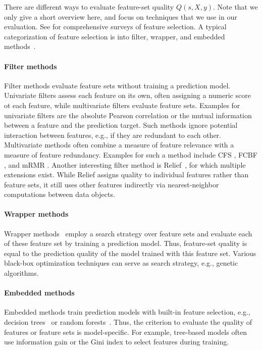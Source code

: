 \documentclass{article}
\theoremstyle{definition}
\begin{document}
There are different ways to evaluate feature-set quality $Q(s,X,y)$.
Note that we only give a short overview here, and focus on techniques that we use in our evaluation.
See \cite{chandrashekar2014survey,li2017feature} for comprehensive surveys of feature selection.
A typical categorization of feature selection is into filter, wrapper, and embedded methods~\cite{guyon2003introduction}.

\paragraph{Filter methods}

Filter methods evaluate feature sets without training a prediction model.
Univariate filters assess each feature on its own, often assigning a numeric score ot each feature, while multivariate filters evaluate feature sets.
Examples for univariate filters are the absolute Pearson correlation or the mutual information between a feature and the prediction target.
Such methods ignore potential interaction between features, e.g., if they are redundant to each other.
Multivariate methods often combine a measure of feature relevance with a measure of feature redundancy.
Examples for such a method include CFS \cite{hall1999correlation}, FCBF \cite{yu2003feature}, and mRMR \cite{peng2005feature}.
Another interesting filter method is Relief~\cite{kira1992feature}, for which multiple extensions exist.
While Relief assigns quality to individual features rather than feature sets, it still uses other features indirectly via nearest-neighbor computations between data objects.

\paragraph{Wrapper methods}

Wrapper methods~\cite{kohavi1997wrappers} employ a search strategy over feature sets and evaluate each of these feature set by training a prediction model.
Thus, feature-set quality is equal to the prediction quality of the model trained with this feature set.
Various black-box optimization techniques can serve as search strategy, e.g., genetic algorithms.

\paragraph{Embedded methods}

Embedded methods train prediction models with built-in feature selection, e.g., decision trees~\cite{breiman1984classification} or random forests~\cite{breiman2001random}.
Thus, the criterion to evaluate the quality of features or feature sets is model-specific.
For example, tree-based models often use information gain or the Gini index to select features during training.
\end{document}
